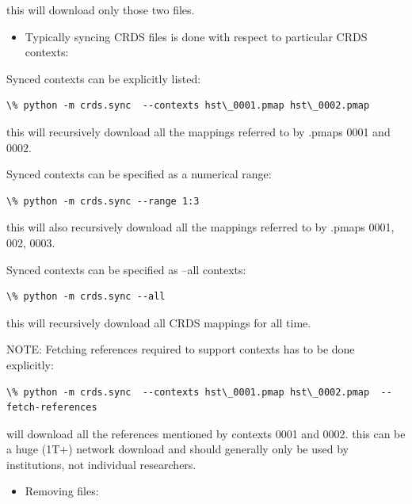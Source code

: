 \documentclass[letterpaper,10pt,english]{sphinxmanual}
\begin{document}
this will download only those two files.
\begin{itemize}
\item {} 
Typically syncing CRDS files is done with respect to particular CRDS contexts:

\end{itemize}

Synced contexts can be explicitly listed:

\begin{Verbatim}[commandchars=\\\{\}]
\% python -m crds.sync  --contexts hst\_0001.pmap hst\_0002.pmap
\end{Verbatim}

this will recursively download all the mappings referred to by .pmaps 0001 and 0002.

Synced contexts can be specified as a numerical range:

\begin{Verbatim}[commandchars=\\\{\}]
\% python -m crds.sync --range 1:3
\end{Verbatim}

this will also recursively download all the mappings referred to by .pmaps 0001, 002, 0003.

Synced contexts can be specified as --all contexts:

\begin{Verbatim}[commandchars=\\\{\}]
\% python -m crds.sync --all
\end{Verbatim}

this will recursively download all CRDS mappings for all time.

NOTE:  Fetching references required to support contexts has to be done explicitly:

\begin{Verbatim}[commandchars=\\\{\}]
\% python -m crds.sync  --contexts hst\_0001.pmap hst\_0002.pmap  --fetch-references
\end{Verbatim}

will download all the references mentioned by contexts 0001 and 0002.
this can be a huge (1T+) network download and should generally only be used by
institutions,  not individual researchers.
\begin{itemize}
\item {} 
Removing files:

\end{itemize}
\end{document}
